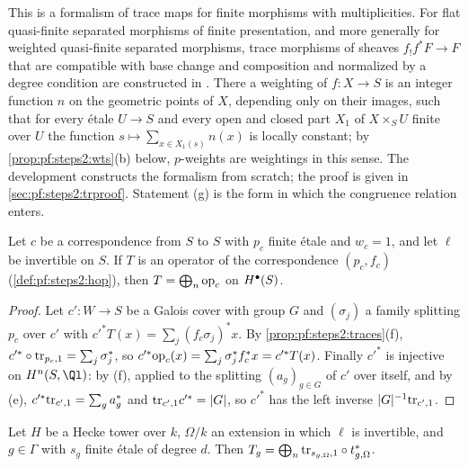 This is a formalism of trace maps for finite morphisms with multiplicities. For flat quasi-finite
separated morphisms of finite presentation, and more generally for weighted quasi-finite separated
morphisms, trace morphisms of sheaves $f_!f^\ast F\to F$ that are compatible with base change and
composition and normalized by a degree condition are constructed in
\cite[Exp.~XVII, 6.2.3, 6.2.5]{ArtinGrothendieckVerdier1972}. There a weighting of $f\colon X\to S$ is an
integer function $n$ on the geometric points of $X$, depending only on their images, such that for
every \'etale $U\to S$ and every open and closed part $X_1$ of $X\times_SU$ finite over $U$ the function
$s\mapsto\sum_{x\in X_1(s)}n(x)$ is locally constant; by \cref{prop:pf:steps2:wts}(b) below, $p$-weights
are weightings in this sense. The development constructs the formalism from scratch; the proof is
given in \cref{sec:pf:steps2:trproof}. Statement (g) is the form in which the congruence relation
enters.
\begin{lemma}\label{lem:pf:steps2:corropeq}
Let $c$ be a correspondence from $S$ to $S$ with $p_c$ finite \'etale and $w_c=1$, and let $\ell$ be
invertible on $S$. If $T$ is an operator of the correspondence $(p_c,f_c)$
(\cref{def:pf:steps2:hop}), then $T=\bigoplus_n\mathrm{op}_c$ on $H^{\bullet}(S)$.
\end{lemma}

\begin{proof}
Let $c'\colon W\to S$ be a Galois cover with group $G$ and $(\sigma_j)$ a family splitting $p_c$ over
$c'$ with $c'^\ast T(x)=\sum_j(f_c\sigma_j)^\ast x$. By \cref{prop:pf:steps2:traces}(f),
$c'^\ast\circ\mathrm{tr}_{p_c,1}=\sum_j\sigma_j^\ast$, so $c'^\ast\mathrm{op}_c(x)=\sum_j\sigma_j^\ast
f_c^\ast x=c'^\ast T(x)$. Finally $c'^\ast$ is injective on $H^n(S,\Ql)$: by (f), applied to the
splitting $(a_g)_{g\in G}$ of $c'$ over itself, and by (e), $c'^\ast\mathrm{tr}_{c',1}=\sum_ga_g^\ast$
and $\mathrm{tr}_{c',1}c'^\ast=|G|$, so $c'^\ast$ has the left inverse $|G|^{-1}\mathrm{tr}_{c',1}$.
\end{proof}

\begin{lemma}\label{lem:pf:steps2:hopop}
Let $H$ be a Hecke tower over $k$, $\Omega/k$ an extension in which $\ell$ is invertible, and
$g\in\Gamma$ with $s_g$ finite \'etale of degree $d$. Then
$T_g=\bigoplus_n\mathrm{tr}_{s_{g,\Omega},1}\circ t_{g,\Omega}^\ast$.
\end{lemma}

